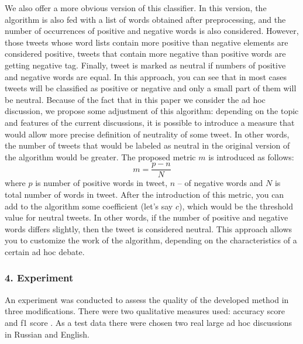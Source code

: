 We also offer a more obvious version of this classifier. In this version, the algorithm is also fed with a list of words obtained after preprocessing, and the number of occurrences of positive and negative words is also considered. However, those tweets whose word lists contain more positive than negative elements are considered positive, tweets that contain more negative than positive words are getting negative tag. Finally, tweet is marked as neutral if numbers of positive and negative words are equal. In this approach, you can see that in most cases tweets will be classified as positive or negative and only a small part of them will be neutral. Because of the fact that in this paper we consider the ad hoc discussion, we propose some adjustment of this algorithm: depending on the topic and features of the current discussions, it is possible to introduce a measure that would allow more precise definition of neutrality of some tweet. In other words, the number of tweets that would be labeled as neutral in the original version of the algorithm would be greater. The proposed metric \(m\) is introduced as follows:
\begin{equation}
	\label{eqn:31}
	m = \frac{p - n}{N}
\end{equation}
where \(p\) is number of positive words in tweet, \(n\) -- of negative words and \(N\) is total number of words in tweet. After the introduction of this metric, you can add to the algorithm some coefficient (let’s say \(c\)), which would be the threshold value for neutral tweets. In other words, if the number of positive and negative words differs slightly, then the tweet is considered neutral. This approach allows you to customize the work of the algorithm, depending on the characteristics of a certain ad hoc debate.

\subsubsection{4. Experiment}
An experiment was conducted to assess the quality of the developed method in three modifications. There were two qualitative measures used: accuracy score and f1 score \cite{Powers}. As a test data there were chosen two real large ad hoc discussions \cite{SmoliarovaBlekanovBodrunova} in Russian and English.

